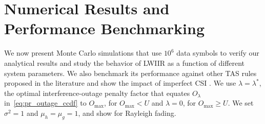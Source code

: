 \documentclass[12pt,draftcls,peerreview,onecolumn]{IEEEtran}
\newcommand{\lam}{\lambda}
\newcommand{\lamstar}{\lam^{*}}
\newcommand{\mug}{{\mu_{g}}}
\newcommand{\muh}{{\mu_{h}}}
\newcommand{\Nt}{{N_t}}
\newcommand{\Nr}{{N_r}}
\newcommand{\Pt}{{P_t}}
\newcommand{\noisevar}{\sigma^2}
\newcommand{\outmax}{O_{\text{max}}}
\newcommand{\itau}{\tau}
\newcommand{\out}{O}
\newcommand{\un}{U}
\newcommand{\caluncons}{{\cal S_{\text{0}}}}
\newcommand{\outlam}{\out_{\lam}}
\begin{document}
\section{Numerical Results and Performance Benchmarking}
\label{sec:results}
We now present Monte Carlo simulations that use $10^6$ data symbols to verify our analytical results  and study the behavior of LWIIR as a function of different system parameters. We also benchmark its performance against other TAS rules proposed in the literature and show the impact of imperfect CSI . We use  $\lam=\lamstar$, the optimal interference-outage penalty factor that equates $\outlam$ in~\eqref{eq:pr_outage_ccdf} to $\outmax$, for $\outmax < \un$ and $\lam=0$,  for $\outmax \geq \un$. We set $\noisevar =1$ and $\muh =\mug = 1$, and show for Rayleigh fading. 

\end{document}
